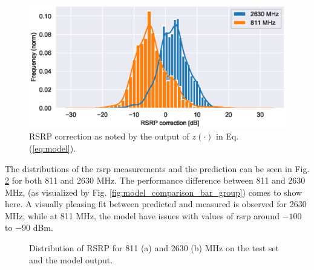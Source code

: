 \begin{figure}
    \centering
    \includegraphics{chapters/part_pathloss/model_aided_paper/rsrp_correction_hist.eps}
    \caption{RSRP correction as noted by the output of $z(\cdot)$ in Eq. (\ref{eq:model}).}
    \label{fig:rsrp_correction_hist}
\end{figure}

The distributions of the \gls{rsrp} measurements and the prediction can be seen in Fig. \ref{fig:dist_pred_target} for both 811 and 2630 MHz. The performance difference between 811 and 2630 MHz, (as visualized by Fig. \ref{fig:model_comparison_bar_group}) comes to show here. A visually pleasing fit between predicted and measured is observed for 2630 MHz, while at 811 MHz, the model have issues with values of \gls{rsrp} around $-100$ to $-90$ dBm.

\begin{figure}
    \centering
    \caption{Distribution of RSRP for 811 (a) and 2630 (b) MHz on the test set and the model output.}
    \label{fig:dist_pred_target}
\end{figure}

